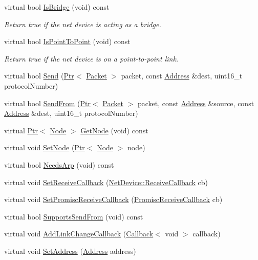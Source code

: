 \begin{DoxyCompactItemize}
virtual bool \hyperlink{classns3_1_1UanNetDevice_a18646020a7efafd7f74217d7ad9edf76}{Is\+Bridge} (void) const 
\begin{DoxyCompactList}\small\item\em Return true if the net device is acting as a bridge. \end{DoxyCompactList}\item 
virtual bool \hyperlink{classns3_1_1UanNetDevice_a914ed77672de3652a366a84b1e582de7}{Is\+Point\+To\+Point} (void) const 
\begin{DoxyCompactList}\small\item\em Return true if the net device is on a point-\/to-\/point link. \end{DoxyCompactList}\item 
virtual bool \hyperlink{classns3_1_1UanNetDevice_aca7865bf58e980106b68a177d41d346b}{Send} (\hyperlink{classns3_1_1Ptr}{Ptr}$<$ \hyperlink{classns3_1_1Packet}{Packet} $>$ packet, const \hyperlink{classns3_1_1Address}{Address} \&dest, uint16\+\_\+t protocol\+Number)
\item 
virtual bool \hyperlink{classns3_1_1UanNetDevice_acbce400d57951dd7b9207068ad080191}{Send\+From} (\hyperlink{classns3_1_1Ptr}{Ptr}$<$ \hyperlink{classns3_1_1Packet}{Packet} $>$ packet, const \hyperlink{classns3_1_1Address}{Address} \&source, const \hyperlink{classns3_1_1Address}{Address} \&dest, uint16\+\_\+t protocol\+Number)
\item 
virtual \hyperlink{classns3_1_1Ptr}{Ptr}$<$ \hyperlink{classns3_1_1Node}{Node} $>$ \hyperlink{classns3_1_1UanNetDevice_a5568381797d83e788086ac2dcd34b14d}{Get\+Node} (void) const 
\item 
virtual void \hyperlink{classns3_1_1UanNetDevice_a8996251b8e755fa575acd4746538d5a3}{Set\+Node} (\hyperlink{classns3_1_1Ptr}{Ptr}$<$ \hyperlink{classns3_1_1Node}{Node} $>$ node)
\item 
virtual bool \hyperlink{classns3_1_1UanNetDevice_a82a4180f4ae1538878aec6a882794e91}{Needs\+Arp} (void) const 
\item 
virtual void \hyperlink{classns3_1_1UanNetDevice_acee91182c836cd8dfbbd8e46271dc9be}{Set\+Receive\+Callback} (\hyperlink{classns3_1_1NetDevice_ad5e5e1ca187472bc2ba99575d8def568}{Net\+Device\+::\+Receive\+Callback} cb)
\item 
virtual void \hyperlink{classns3_1_1UanNetDevice_a446e2bdaff56460e8f64374c954642cb}{Set\+Promisc\+Receive\+Callback} (\hyperlink{classns3_1_1NetDevice_a427225795919f26c414bee2ea3f31ed2}{Promisc\+Receive\+Callback} cb)
\item 
virtual bool \hyperlink{classns3_1_1UanNetDevice_a874384b989b22f6b00bd55fdb2927e39}{Supports\+Send\+From} (void) const 
\item 
virtual void \hyperlink{classns3_1_1UanNetDevice_ac2a471c884f18f1c5779503371bdf3cc}{Add\+Link\+Change\+Callback} (\hyperlink{classns3_1_1Callback}{Callback}$<$ void $>$ callback)
\item 
virtual void \hyperlink{classns3_1_1UanNetDevice_a4e0c30c0b67bae0eb769336688799e02}{Set\+Address} (\hyperlink{classns3_1_1Address}{Address} address)
\end{DoxyCompactItemize}
